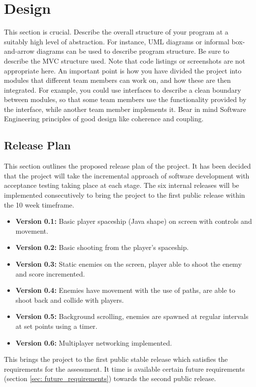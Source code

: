 \chapter{Design}
\label{cha:design}

This section is crucial. Describe the overall structure of your
program at a suitably high level of abstraction. For instance, UML
diagrams or informal box-and-arrow diagrams can be used to describe
program structure. Be sure to describe the MVC structure used. Note
that code listings or screenshots are not appropriate here. An
important point is how you have divided the project into modules
that different team members can work on, and how these are then
integrated. For example, you could use interfaces to describe a
clean boundary between modules, so that some team members use the
functionality provided by the interface, while another team member
implements it. Bear in mind Software Engineering principles of good
design like coherence and coupling.

\section{Release Plan}
\label{sec: release_plan}
This section outlines the proposed release plan of the project. It has been decided that the project will take the incremental approach of software development with acceptance testing taking place at each stage. The six internal releases will be implemented consecutively to bring the project to the first public release within the 10 week timeframe.

\begin{itemize}
\item \textbf{Version 0.1:} Basic player spaceship (Java shape) on screen with controls and movement.
\item \textbf{Version 0.2:} Basic shooting from the player's spaceship.
\item \textbf{Version 0.3:} Static enemies on the screen, player able to shoot the enemy and score incremented.
\item \textbf{Version 0.4:} Enemies have movement with the use of paths, are able to shoot back and collide with players.
\item \textbf{Version 0.5:} Background scrolling, enemies are spawned at regular intervals at set points using a timer.
\item \textbf{Version 0.6:} Multiplayer networking implemented.
\end{itemize} This brings the project to the first public stable release which satisfies the requirements for the assessment. It time is available certain future requirements (section \ref{sec: future_requirements}) towards the second public release.


